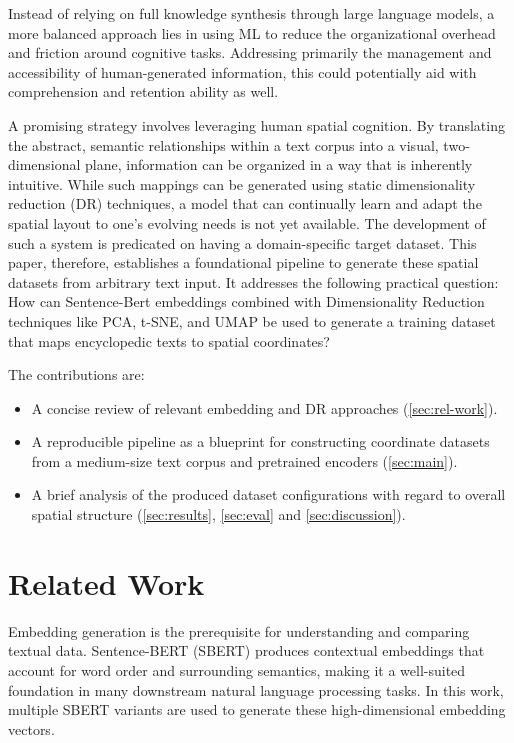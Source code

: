 Instead of relying on full knowledge synthesis through large language models, a more balanced approach lies in using ML to reduce the organizational overhead and friction around cognitive tasks. Addressing primarily the management and accessibility of human-generated information, this could potentially aid with comprehension and retention ability as well.

A promising strategy involves leveraging human spatial cognition. By translating the abstract, semantic relationships within a text corpus into a visual, two-dimensional plane, information can be organized in a way that is inherently intuitive. While such mappings can be generated using static dimensionality reduction (DR) techniques, a model that can continually learn and adapt the spatial layout to one's evolving needs is not yet available. The development of such a system is predicated on having a domain-specific target dataset. This paper, therefore, establishes a foundational pipeline to generate these spatial datasets from arbitrary text input. It addresses the following practical question: How can Sentence-Bert embeddings combined with Dimensionality Reduction techniques like PCA, t-SNE, and UMAP be used to generate a training dataset that maps encyclopedic texts to spatial coordinates?

The contributions are:
\begin{itemize}
    \item A concise review of relevant embedding and DR approaches (\autoref{sec:rel-work}).
    \item A reproducible pipeline as a blueprint for constructing coordinate datasets from a medium-size text corpus and pretrained encoders (\autoref{sec:main}).
    \item A brief analysis of the produced dataset configurations with regard to overall spatial structure (\autoref{sec:results}, \autoref{sec:eval} and \autoref{sec:discussion}).
\end{itemize}

\section{Related Work}
\label{sec:rel-work}

Embedding generation is the prerequisite for understanding and comparing textual data. Sentence-BERT (SBERT) \cite{reimersSentenceBERTSentenceEmbeddings2019a} produces contextual embeddings that account for word order and surrounding semantics, making it a well-suited foundation in many downstream natural language processing tasks. In this work, multiple SBERT variants are used to generate these high-dimensional embedding vectors.

